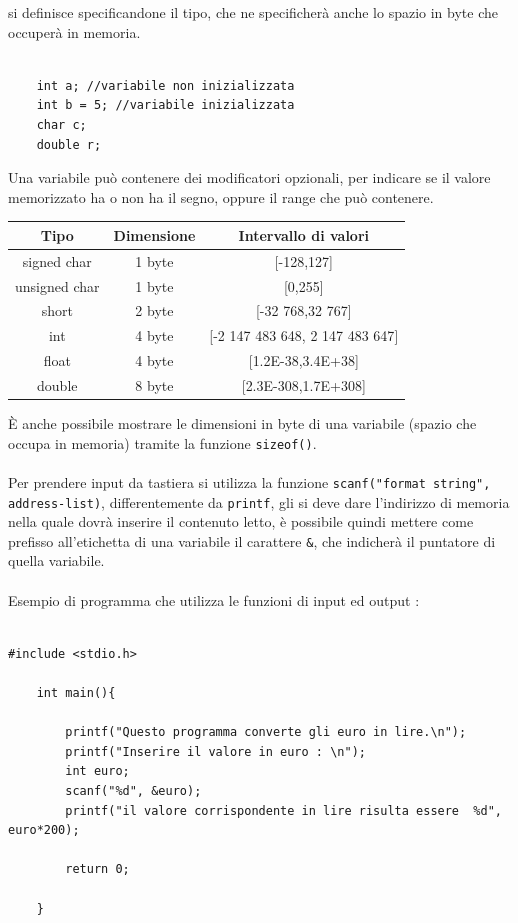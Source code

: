 \documentclass[12pt, letterpaper]{article}
\newcommand{\code}[1]{\colorbox{light-gray}{\texttt{#1}}}
\newcommand{\acc}{\\\hphantom{}\\}
\begin{document}
si definisce specificandone il tipo, che ne specificherà anche lo spazio in byte che occuperà in memoria. 
\begin{lstlisting}[style=CStyle]
    
    int a; //variabile non inizializzata
    int b = 5; //variabile inizializzata
    char c;
    double r;
    \end{lstlisting}
Una variabile può contenere dei modificatori opzionali, per indicare se il valore memorizzato ha o non ha il segno, 
oppure il range che può contenere.\begin{center}
    \begin{tabular}{|c|c|c|}
        \hline
        \rowcolor[HTML]{C0C0C0} 
        Tipo          & Dimensione & Intervallo di valori                \\ \hline
        signed char   & 1 byte     & {[}-128,127{]}                      \\ \hline
        unsigned char & 1 byte     & {[}0,255{]}                         \\ \hline
        short         & 2 byte     & {[}-32 768,32 767{]}                \\ \hline
        int           & 4 byte     & {[}-2 147 483 648, 2 147 483 647{]} \\ \hline
        float         & 4 byte     & {[}1.2E-38,3.4E+38{]}               \\ \hline
        double        & 8 byte     & {[}2.3E-308,1.7E+308{]}             \\ \hline
        \end{tabular}
\end{center}
È anche possibile mostrare le dimensioni in byte di una variabile (spazio che occupa in memoria) tramite la 
funzione \code{sizeof()}.\acc 
Per prendere input da tastiera si utilizza la funzione \code{scanf("format string", address-list)}, differentemente 
da \code{printf}, gli si deve dare l'indirizzo di memoria nella quale dovrà inserire il contenuto letto, è possibile quindi 
mettere come prefisso all'etichetta di una variabile il carattere \code{\&}, che indicherà il puntatore di quella variabile.\acc 
Esempio di programma che utilizza le funzioni di input ed output :
\begin{lstlisting}[style=CStyle]

#include <stdio.h>

    int main(){

        printf("Questo programma converte gli euro in lire.\n");
        printf("Inserire il valore in euro : \n");
        int euro;
        scanf("%d", &euro);
        printf("il valore corrispondente in lire risulta essere  %d", euro*200); 

        return 0;

    }
    \end{lstlisting}
\end{document}

